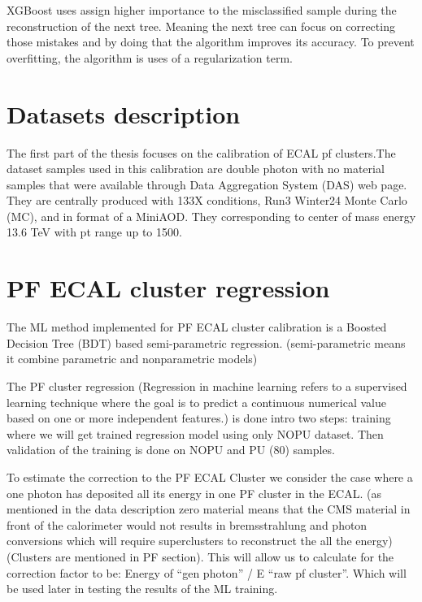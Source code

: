 XGBoost uses assign higher importance to the misclassified sample during the reconstruction of the next tree. Meaning the next tree can focus on correcting those mistakes and by doing that the algorithm improves its accuracy. To prevent overfitting, the algorithm is uses of a regularization term.


\section{Datasets description}

The first part of the thesis focuses on the calibration of ECAL pf clusters.The dataset samples used in this calibration are double photon with no material samples that were available through Data Aggregation System (DAS) web page.   
They are centrally produced with 133X %
conditions, Run3 Winter24 Monte Carlo (MC), and in format of a MiniAOD. They corresponding to center of mass energy 13.6 TeV with pt range up to 1500.  


\section{PF ECAL cluster regression}
The ML method implemented for PF ECAL cluster calibration is a Boosted Decision Tree (BDT) based semi-parametric regression. (semi-parametric means it combine parametric and nonparametric models) %

The PF cluster regression (Regression in machine learning refers to a supervised learning technique where the goal is to predict a continuous numerical value based on one or more independent features.) %
is done intro two steps: training where we will get trained regression model using only NOPU dataset. Then validation of the training is done on NOPU and PU (80) samples.

To estimate the correction to the PF ECAL Cluster we consider the case where a one photon has deposited all its energy in one PF cluster in the ECAL.  (as mentioned in the data description zero material means that the CMS material in front of the calorimeter would not results in bremsstrahlung and photon conversions which will require superclusters to reconstruct the all the energy) (Clusters are mentioned in PF section). This will allow us to calculate for the correction factor to be: Energy of “gen photon” / E “raw pf cluster”. Which will be used later in testing the results of the ML training.

